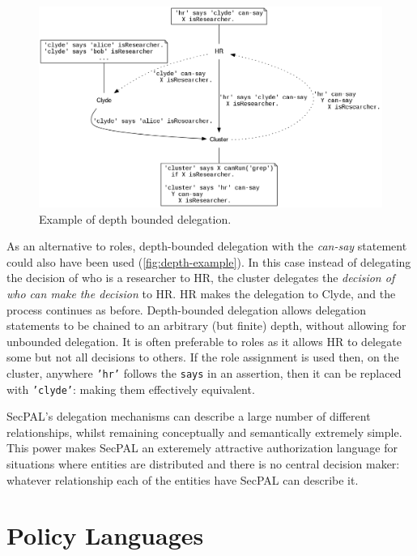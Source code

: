 \documentclass[thesis.tex]{subfiles}
\begin{document}
\begin{figure}
  \centering
  \includegraphics[width=\textwidth]{figures/secpal-example-delegation2.png}
  \caption{Example of depth bounded delegation.}
  \label{fig:depth-example}
\end{figure}

As an alternative to roles, depth-bounded delegation with the
\emph{can-say} statement could also have been used
(\autoref{fig:depth-example}).  In this case instead of delegating the
decision of who is a researcher to HR, the cluster delegates the
\emph{decision of who can make the decision} to HR.  HR makes the
delegation to Clyde, and the process continues as before.
Depth-bounded delegation allows delegation statements to be chained to
an arbitrary (but finite) depth, without allowing for unbounded
delegation.  It is often preferable to roles as it allows HR to
delegate some but not all decisions to others.  If the role assignment
is used then, on the cluster, anywhere \texttt{'hr'} follows the
\texttt{says} in an assertion, then it can be replaced with
\texttt{'clyde'}: making them effectively equivalent.

SecPAL's delegation mechanisms can describe a large number of
different relationships, whilst remaining conceptually and
semantically extremely simple.  This power makes SecPAL an exteremely
attractive authorization language for situations where entities are
distributed and there is no central decision maker: whatever
relationship each of the entities have SecPAL can describe it.

\section{Policy Languages}
\end{document}
